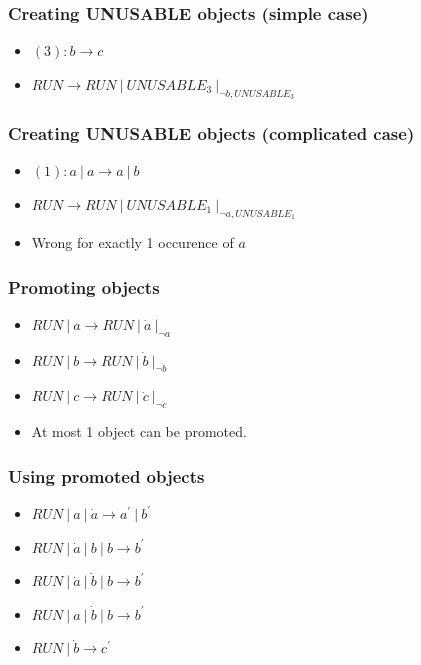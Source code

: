     \begin{frame}[t]\frametitle{Creating UNUSABLE objects (simple case)}
      \begin{itemize}
        \item $(3): b \rightarrow c$
        \item $RUN \rightarrow RUN\ |\ UNUSABLE_3\ |_{\neg{b,UNUSABLE_3}}$
      \end{itemize}
    \end{frame}
    \note{}

    \begin{frame}[t]\frametitle{Creating UNUSABLE objects (complicated case)}
      \begin{itemize}
        \item $(1): a\ |\ a \rightarrow a\ |\ b$
        \item $RUN \rightarrow RUN\ |\ UNUSABLE_1\ |_{\neg{a,UNUSABLE_1}}$
        \item Wrong for exactly 1 occurence of $a$
      \end{itemize}
    \end{frame}
    \note{}

    \begin{frame}[t]\frametitle{Promoting objects}
      \begin{itemize}
        \item $RUN\ |\ a \rightarrow RUN\ |\ \dot{a}\ |_{\neg{\dot{a}}}$
        \item $RUN\ |\ b \rightarrow RUN\ |\ \dot{b}\ |_{\neg{\dot{b}}}$
        \item $RUN\ |\ c \rightarrow RUN\ |\ \dot{c}\ |_{\neg{\dot{c}}}$
        \item At most 1 object can be promoted.
      \end{itemize}
    \end{frame}
    \note{}

    \begin{frame}[t]\frametitle{Using promoted objects}
      \begin{itemize}
        \item $RUN\ |\ a\ |\ \dot{a} \rightarrow a^{\prime}\ |\ b^{\prime}$
        \item $RUN\ |\ \dot{a}\ |\ b\ |\ b \rightarrow b^{\prime}$
        \item $RUN\ |\ \dot{a}\ |\ \dot{b}\ |\ b \rightarrow b^{\prime}$
        \item $RUN\ |\ a\ |\ \dot{b}\ |\ b \rightarrow b^{\prime}$
        \item $RUN\ |\ \dot{b} \rightarrow c^{\prime}$
      \end{itemize}
    \end{frame}
    \note{}

